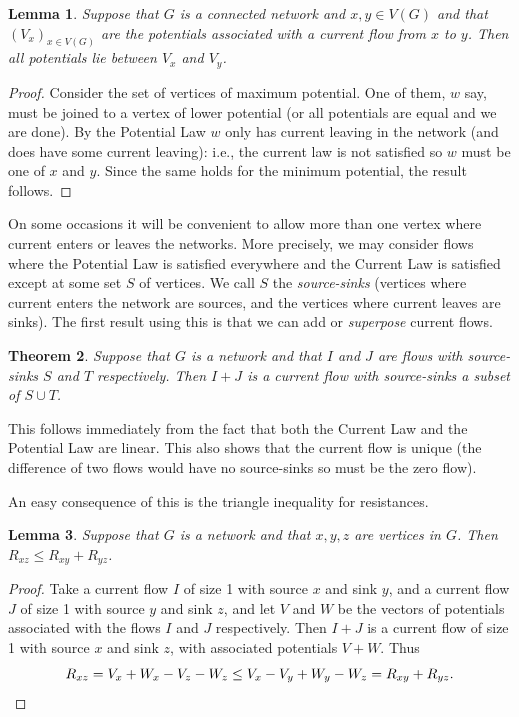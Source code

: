 \documentclass[11pt]{article}
\newtheorem{theorem}{Theorem}
\newtheorem{lemma}[theorem]{Lemma}
\theoremstyle{remark}
\begin{document}
\begin{lemma}
  Suppose that $G$ is a connected network and $x,y\in V(G)$ and that
  $(V_x)_{x\in V(G)}$ are the potentials associated with a current flow
    from $x$ to $y$. Then all potentials lie between $V_x$ and $V_y$.
\end{lemma}
\begin{proof}
  Consider the set of vertices of maximum potential. One of them, $w$
  say, must be joined to a vertex of lower potential (or all
  potentials are equal and we are done). By the Potential Law $w$ only
  has current leaving in the network (and does have some current leaving):
  i.e., the current law is not satisfied so $w$ must be one of $x$ and
  $y$. Since the same holds for the minimum potential, the result
  follows.
\end{proof}

On some occasions it will be convenient to allow more than one vertex
where current enters or leaves the networks. More precisely, we may
consider flows where the Potential Law is satisfied everywhere and the
Current Law is satisfied except at some set $S$ of vertices. We call
$S$ the \emph{source-sinks} (vertices where current enters the network are
sources, and the vertices where current leaves are sinks). The first
result using this is that we can add or \emph{superpose} current flows.

\begin{theorem}
  Suppose that $G$ is a network and that $I$ and $J$ are flows with
  source-sinks $S$ and $T$ respectively. Then $I+J$ is a current flow
  with source-sinks a subset of $S\cup T$.
\end{theorem}
This follows immediately from the fact that both the Current Law and
the Potential Law are linear.  This also shows that the current flow
is unique (the difference of two flows would have no source-sinks so
must be the zero flow).

An easy consequence of this is the triangle inequality for
resistances.
\begin{lemma}\label{l:triangle-inequality}
  Suppose that $G$ is a network and that $x,y,z$ are vertices in
  $G$. Then $R_{xz}\le R_{xy}+R_{yz}$.
\end{lemma}
\begin{proof}
  Take a current flow $I$ of size 1 with source $x$ and sink $y$, and
  a current flow $J$ of size 1 with source $y$ and sink $z$, and let
  $V$ and $W$ be the vectors of potentials associated with the flows
  $I$ and $J$ respectively.   Then $I+J$ is a current flow of size 1
  with source $x$ and sink $z$, with associated potentials $V+W$. Thus
  \[
  R_{xz}=V_x+W_x-V_z-W_z\le V_x-V_y+W_y-W_z=R_{xy}+R_{yz}.\qedhere
  \]
\end{proof}
\end{document}
